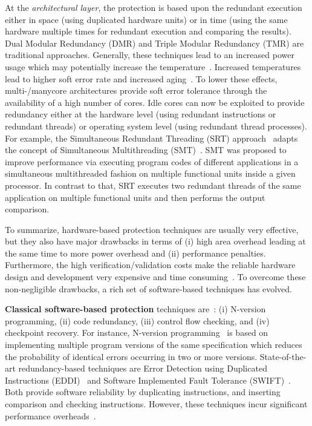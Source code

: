 At the \emph{architectural layer}, the protection is based upon the redundant execution either in space (using duplicated hardware units) or in time (using the same hardware multiple times for redundant execution and comparing the results). Dual Modular Redundancy (DMR) and Triple Modular Redundancy (TMR) are traditional approaches. Generally, these techniques lead to an increased power usage which may potentially increase the temperature~\cite{DBLP:books/daglib/0037372}. Increased temperatures lead to higher soft error rate and increased aging~\cite{DBLP:books/daglib/0037372}. To lower these effects, multi-/manycore architectures provide soft error tolerance through the availability of a high number of cores. Idle cores can now be exploited to provide redundancy either at the hardware level (using redundant instructions or redundant threads) or operating system level (using redundant thread processes). For example, the Simultaneous Redundant Threading (SRT) approach~\cite{DBLP:conf/isca/ReinhardtM00} adapts the concept of Simultaneous Multithreading (SMT)~\cite{DBLP:conf/isca/TullsenEL95}. SMT was proposed to improve performance via executing program codes of different applications in a simultaneous multithreaded fashion on multiple functional units inside a given processor. In contrast to that, SRT executes two redundant threads of the same application on multiple functional units and then performs the output comparison. 

To summarize, hardware-based protection techniques are usually very effective, but they also have major drawbacks in terms of (i) high area overhead leading at the same time to more power overhead and (ii) performance penalties. Furthermore, the high verification/validation costs make the reliable hardware design and development very expensive and time consuming~\cite{DBLP:books/daglib/0037372}. To overcome these non-negligible drawbacks, a rich set of software-based techniques has evolved. 

\textbf{Classical software-based protection} techniques are~\cite{goloubeva2006software,DBLP:books/daglib/0037372}: (i) N-version programming, (ii) code redundancy, (iii) control flow checking, and (iv) checkpoint recovery. For instance, N-version programming~\cite{DBLP:journals/tse/Avizienis85} is based on implementing multiple program versions of the same specification which reduces the probability of identical errors occurring in two or more versions. State-of-the-art redundancy-based techniques are Error Detection using Duplicated Instructions (EDDI)~\cite{oh2002error} and Software Implemented Fault Tolerance (SWIFT)~\cite{DBLP:conf/cgo/ReisCVRA05}. Both provide software reliability by duplicating instructions, and inserting comparison and checking instructions. However, these techniques incur significant performance overheads~\cite{oh2002error,DBLP:conf/cgo/ReisCVRA05}. %

